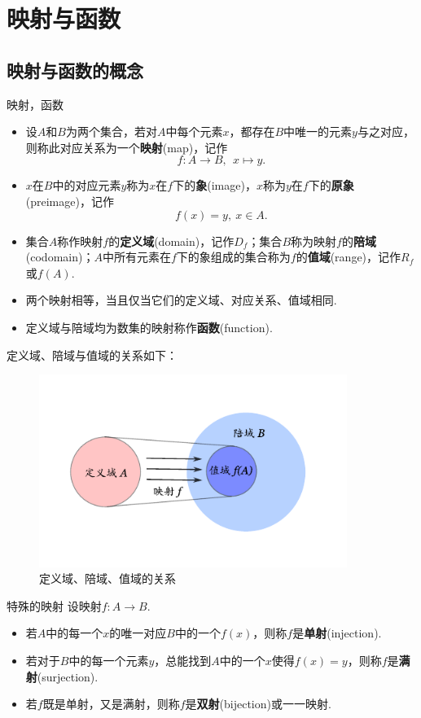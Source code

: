 \documentclass[lang=cn, zihao=5]{elegantbook}
\begin{document}
\section{映射与函数}

\subsection{映射与函数的概念}

\begin{definition}{映射，函数}
	\begin{itemize}
		\item 设$A$和$B$为两个集合，若对$A$中每个元素$x$，都存在$B$中唯一的元素$y$与之对应，则称此对应关系为一个\textbf{映射}(map)，记作$$f:A \to B,~~x \mapsto y.$$
		\item $x$在$B$中的对应元素$y$称为$x$在$f$下的\textbf{象}(image)，$x$称为$y$在$f$下的\textbf{原象}(preimage)，记作$$f(x) = y,~ x \in A.$$
		\item 集合$A$称作映射$f$的\textbf{定义域}(domain)，记作$D_f$；集合$B$称为映射$f$的\textbf{陪域}(codomain)；$A$中所有元素在$f$下的象组成的集合称为$f$的\textbf{值域}(range)，记作$R_f$或$f(A)$.
		\item 两个映射相等，当且仅当它们的定义域、对应关系、值域相同.
		\item 定义域与陪域均为数集的映射称作\textbf{函数}(function).
	\end{itemize}
\end{definition}

定义域、陪域与值域的关系如下：

\begin{figure}[h!]
	\centering
	\includegraphics[width=10cm]{attachment/20230403ykue.pdf}
	\caption{定义域、陪域、值域的关系}
\end{figure}

\begin{definition}{特殊的映射}
	设映射$f:A \to B$.
	\begin{itemize}
		\item 若$A$中的每一个$x$的唯一对应$B$中的一个$f(x)$，则称$f$是\textbf{单射}(injection).
		\item 若对于$B$中的每一个元素$y$，总能找到$A$中的一个$x$使得$f(x)=y$，则称$f$是\textbf{满射}(surjection).
		\item 若$f$既是单射，又是满射，则称$f$是\textbf{双射}(bijection)或一一映射.
	\end{itemize}
\end{definition}
\end{document}
